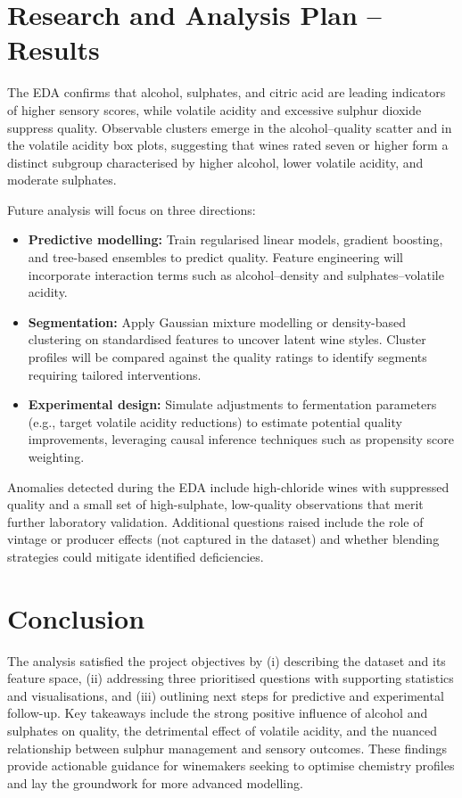 \documentclass[11pt]{article}
\begin{document}
\section{Research and Analysis Plan -- Results}
The EDA confirms that alcohol, sulphates, and citric acid are leading indicators
of higher sensory scores, while volatile acidity and excessive sulphur dioxide
suppress quality. Observable clusters emerge in the alcohol--quality scatter and
in the volatile acidity box plots, suggesting that wines rated seven or higher
form a distinct subgroup characterised by higher alcohol, lower volatile acidity,
and moderate sulphates.

Future analysis will focus on three directions:
\begin{itemize}
  \item \textbf{Predictive modelling:} Train regularised linear models, gradient boosting, and tree-based ensembles to predict quality. Feature engineering will incorporate interaction terms such as alcohol--density and sulphates--volatile acidity.
  \item \textbf{Segmentation:} Apply Gaussian mixture modelling or density-based clustering on standardised features to uncover latent wine styles. Cluster profiles will be compared against the quality ratings to identify segments requiring tailored interventions.
  \item \textbf{Experimental design:} Simulate adjustments to fermentation parameters (e.g., target volatile acidity reductions) to estimate potential quality improvements, leveraging causal inference techniques such as propensity score weighting.
\end{itemize}

Anomalies detected during the EDA include high-chloride wines with suppressed
quality and a small set of high-sulphate, low-quality observations that merit
further laboratory validation. Additional questions raised include the role of
vintage or producer effects (not captured in the dataset) and whether blending
strategies could mitigate identified deficiencies.

\section{Conclusion}
The analysis satisfied the project objectives by (i) describing the dataset and
its feature space, (ii) addressing three prioritised questions with supporting
statistics and visualisations, and (iii) outlining next steps for predictive and
experimental follow-up. Key takeaways include the strong positive influence of
alcohol and sulphates on quality, the detrimental effect of volatile acidity,
and the nuanced relationship between sulphur management and sensory outcomes.
These findings provide actionable guidance for winemakers seeking to optimise
chemistry profiles and lay the groundwork for more advanced modelling.
\end{document}
